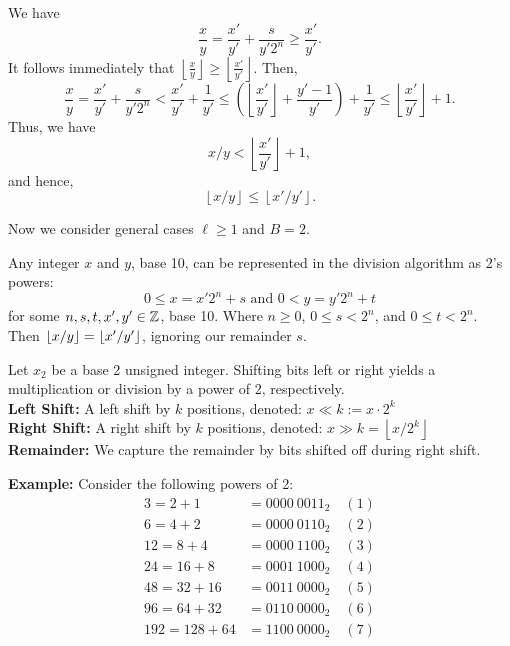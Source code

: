 \newpage

\begin{Proof}

    We have
\[
\frac{x}{y} = \frac{x'}{y'} + \frac{s}{y'2^n} \geq \frac{x'}{y'}.
\]
It follows immediately that $ \left\lfloor \frac{x}{y} \right\rfloor \geq \left\lfloor \frac{x'}{y'} \right\rfloor$. Then,
\[
\frac{x}{y} = \frac{x'}{y'} + \frac{s}{y'2^n} < \frac{x'}{y'} + \frac{1}{y'} \leq \left( \left\lfloor \frac{x'}{y'} \right\rfloor + \frac{y'-1}{y'} \right) + \frac{1}{y'} \leq \left\lfloor \frac{x'}{y'} \right\rfloor + 1.
\]
Thus, we have
\[
x/y < \left\lfloor \frac{x'}{y'} \right\rfloor + 1,
\]
and hence, 
\[
\left\lfloor x/y \right\rfloor \leq \left\lfloor x'/y' \right\rfloor.
\]
\end{Proof}
\noindent
Now we consider general cases $\ell\geq1$ and $B=2$.
\begin{theo}
    
    Any integer $x$ and $y$, base 10, can be represented in the division algorithm as 2's powers:
    \[0\leq x=x'2^n+s \text{ and } 0 < y = y'2^n+t\]
    \noindent
    for some $n,s,t,x',y'\in\Z$, base 10. Where $n\geq 0$, $0\leq s < 2^n$, and $0\leq t < 2^n$. Then $\floor*{x/y}=\floor*{x'/y'}$, ignoring our remainder $s$.

\end{theo}


\newpage

\begin{theo}

    Let $x_2$ be a base 2 unsigned integer. Shifting bits left or right yields a multiplication or division by a power of 2, respectively.\\

    \noindent
    \textbf{Left Shift:} A left shift by $k$ positions, denoted: $x \ll k:= x \cdot 2^k$\\
    \noindent
    \textbf{Right Shift:} A right shift by $k$ positions, denoted: $x \gg k = \left\lfloor x/2^k \right\rfloor$\\
    \textbf{Remainder:} We capture the remainder by bits shifted off during right shift.
\end{theo}


\newpage

\textbf{Example:} Consider the following powers of 2:
\begin{align*}
    3 = 2 + 1 &= 0000 \ 0011_2 \quad (1) \\
    6 = 4 + 2 &= 0000 \ 0110_2 \quad (2) \\
    12 = 8 + 4 &= 0000 \ 1100_2 \quad (3) \\
    24 = 16 + 8 &= 0001 \ 1000_2 \quad (4) \\
    48 = 32 + 16 &= 0011 \ 0000_2 \quad (5) \\
    96 = 64 + 32 &= 0110 \ 0000_2 \quad (6) \\
    192 = 128 + 64 &= 1100 \ 0000_2 \quad (7)
\end{align*}

